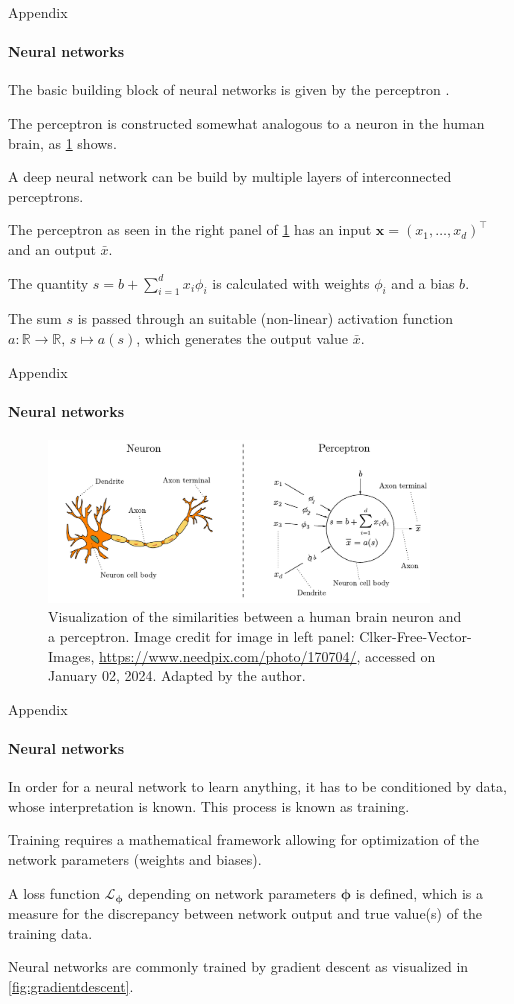 \documentclass{beamer}
\newcommand\vect[1]{\ensuremath{\bm{#1}}}
\begin{document}
\begin{frame}[allowframebreaks]{Appendix}
	\framesubtitle{Neural networks}
	The basic building block of neural networks is given by the perceptron \cite[pp.338-342]{Raschka.2022}.
	
	The perceptron is constructed somewhat analogous to a neuron in the human brain, as \cref{fig:neuronperceptron} shows.
	
	A deep neural network can be build by multiple layers of interconnected perceptrons.
	
	The perceptron as seen in the right panel of \cref{fig:neuronperceptron} has an input $\vect{x} = (x_1,\dots,x_d)^\top$ and an output $\bar{x}$.
	
	The quantity $s = b + \sum_{i=1}^d x_i\phi_i$ is calculated with weights $\phi_i$ and a bias $b$.
	
	The sum $s$ is passed through an suitable (non-linear) activation function $a:\mathbb{R}\rightarrow \mathbb{R}, \, s \mapsto a(s)$, which generates the output value $\bar{x}$.
	
\end{frame}
\begin{frame}[allowframebreaks]{Appendix}
	\framesubtitle{Neural networks}
	
	\begin{figure}[h]
		\centering
		\includegraphics[width=0.9\textwidth]{figures/thesis/neuronperceptron.pdf}
		\caption{Visualization of the similarities between a human brain neuron and a perceptron. Image credit for image in left panel: Clker-Free-Vector-Images, \url{https://www.needpix.com/photo/170704/}, accessed on January 02, 2024. Adapted by the author.}
		\label{fig:neuronperceptron}
	\end{figure}
	
\end{frame}
\begin{frame}[allowframebreaks]{Appendix}
	\framesubtitle{Neural networks}
	
	In order for a neural network to learn anything, it has to be conditioned by data, whose interpretation is known. This process is known as training.
	
	Training requires a mathematical framework allowing for optimization of the network parameters (weights and biases).
	
	A loss function $\mathcal{L}_{\vect{\phi}}$ depending on network parameters $\vect{\phi}$ is defined, which is a measure for the discrepancy between network output and true value(s) of the training data.
	
	Neural networks are commonly trained by gradient descent as visualized in \cref{fig:gradientdescent}.
	
\end{frame}
\end{document}

